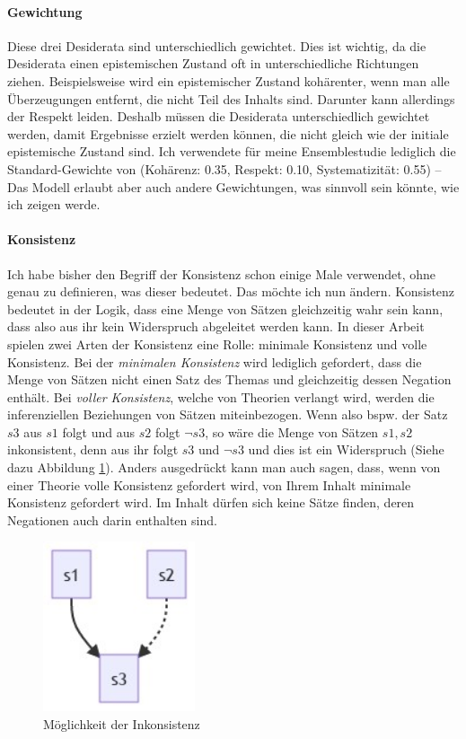 \documentclass{article}
\begin{document}
\paragraph{Gewichtung} Diese drei Desiderata sind unterschiedlich gewichtet. Dies ist wichtig, da die Desiderata einen epistemischen Zustand oft in unterschiedliche Richtungen ziehen. Beispielsweise wird ein epistemischer Zustand kohärenter, wenn man alle Überzeugungen entfernt, die nicht Teil des Inhalts sind. Darunter kann allerdings der Respekt leiden. Deshalb müssen die Desiderata unterschiedlich gewichtet werden, damit Ergebnisse erzielt werden können, die nicht gleich wie der initiale epistemische Zustand sind. Ich verwendete für meine Ensemblestudie lediglich die Standard-Gewichte von \citeauthor{beisbart_making_2021} (Kohärenz: 0.35, Respekt: 0.10, Systematizität: 0.55) -- Das Modell erlaubt aber auch andere Gewichtungen, was sinnvoll sein könnte, wie ich zeigen werde. \parencite[vgl.][S.~448]{beisbart_making_2021}

\paragraph{Konsistenz\label{konsistenz}}
Ich habe bisher den Begriff der Konsistenz schon einige Male verwendet, ohne genau zu definieren, was dieser bedeutet. Das möchte ich nun ändern. Konsistenz bedeutet in der Logik, dass eine Menge von Sätzen gleichzeitig wahr sein kann, dass also aus ihr kein Widerspruch abgeleitet werden kann. In dieser Arbeit spielen zwei Arten der Konsistenz eine Rolle: minimale Konsistenz und volle Konsistenz. Bei der \textit{minimalen Konsistenz} wird lediglich gefordert, dass die Menge von Sätzen nicht einen Satz des Themas und gleichzeitig dessen Negation enthält. Bei \textit{voller Konsistenz}, welche von Theorien verlangt wird, werden die inferenziellen Beziehungen von Sätzen miteinbezogen. Wenn also bspw. der Satz $s3$ aus $s1$ folgt und aus $s2$ folgt $\neg s3$, so wäre die Menge von Sätzen ${s1,s2}$ inkonsistent, denn aus ihr folgt $s3$ und $\neg s3$ und dies ist ein Widerspruch (Siehe dazu Abbildung \ref{fig:inconsistency}). Anders ausgedrückt kann man auch sagen, dass, wenn von einer Theorie volle Konsistenz gefordert wird, von Ihrem Inhalt minimale Konsistenz gefordert wird. Im Inhalt dürfen sich keine Sätze finden, deren Negationen auch darin enthalten sind.

\begin{figure}[ht]
  \centering
  \includegraphics[width=\textwidth,height=5cm,keepaspectratio]{consistence.png}
  \caption{Möglichkeit der Inkonsistenz\label{fig:inconsistency}}
\end{figure}
\end{document}
